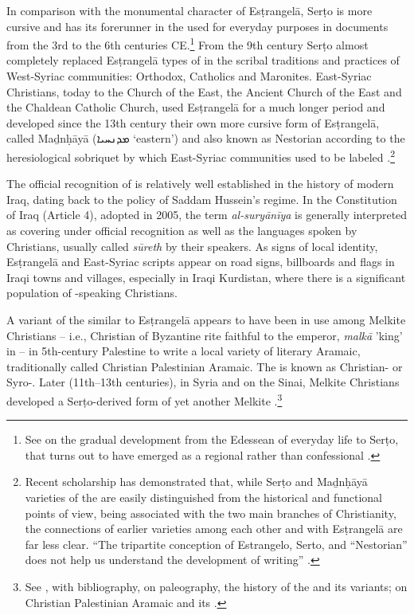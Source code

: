 \documentclass[output=paper,colorlinks,citecolor=brown,arabfont,syriacfont]{langscibook}
\begin{document}
In comparison with the monumental character of Esṭrangelā, Serṭo  is more cursive and has its forerunner in the   used for everyday purposes in documents from the 3rd to the 6th centuries CE.\footnote{%
See \citet{briquel_chatonnet2000} on the gradual development from the Edessean  of everyday life to Serṭo, that turns out to have emerged as a regional rather than confessional .} From the 9th century Serṭo almost completely replaced Esṭrangelā types of  in the scribal traditions and practices of West-Syriac communities:  Orthodox,  Catholics and Maronites. East-Syriac Christians, today  to the  Church of the East, the Ancient Church of the East and the Chaldean Catholic Church, used Esṭrangelā for a much longer period and developed since the 13th century their own more cursive form of Esṭrangelā, called Maḏnḥāyā (\textsyriac{ܡܕܢܚܝܐ} `eastern') and also known as Nestorian according to the heresiological sobriquet by which East-Syriac communities used to be labeled \citep{brock1996}.\footnote{%
Recent scholarship has demonstrated that, while Serṭo and Maḏnḥāyā varieties of the   are easily distinguished from the historical and functional points of view, being associated with the two main branches of  Christianity, the connections of earlier varieties among each other and with Esṭrangelā are far less clear. ``The tripartite conception of Estrangelo, Serto, and ``Nestorian'' does not help us understand the development of  writing'' \citep[220]{borbone2021}.}

The official recognition of  is relatively well established in the history of modern Iraq, dating back to the  policy of Saddam Hussein's regime. In the Constitution of Iraq (Article 4), adopted in 2005, the term \textit{al-suryānīya} is generally interpreted as covering under official recognition  as well as the  languages spoken by Christians, usually called \textit{sūreth} by their speakers. As signs of local identity, Esṭrangelā and East-Syriac scripts appear on road signs, billboards and flags in Iraqi towns and villages, especially in Iraqi Kurdistan, where there is a significant population of -speaking Christians.

A variant of the   similar to Esṭrangelā appears to have been in use among Melkite Christians -- i.e., Christian of  Byzantine rite faithful to the emperor, \textit{malkā} 'king' in  -- in 5th-century Palestine to write a local variety of literary Aramaic, traditionally called Christian Palestinian Aramaic. The  is known as Christian- or Syro-. Later (11th--13th centuries), in Syria and on the Sinai, Melkite Christians developed a Serṭo-derived form of yet another Melkite .\footnote{%
See \citet{schmidt2015}, with bibliography, on  paleography, the history of the   and its variants; \citet[353--354]{kiraz2012} on Christian Palestinian Aramaic and its .} 
\end{document}
